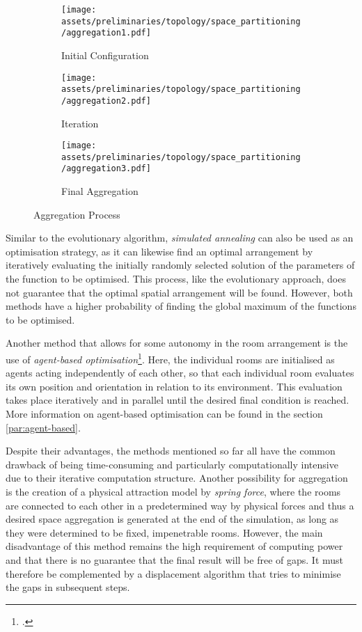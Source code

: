 \documentclass[a4paper, 12pt]{report}
\begin{document}
\begin{figure}
\centering
\begin{subfigure}{.33\textwidth}
\centering
\texttt{[image: assets/preliminaries/topology/space\_partitioning/aggregation1.pdf]}
\caption{Initial Configuration}
\label{fig:initial-configuration}
\end{subfigure}%
\begin{subfigure}{.33\textwidth}
\centering
\texttt{[image: assets/preliminaries/topology/space\_partitioning/aggregation2.pdf]}
\caption{Iteration}
\label{fig:iteration-1}
\end{subfigure}%
\begin{subfigure}{.33\textwidth}
\centering
\texttt{[image: assets/preliminaries/topology/space\_partitioning/aggregation3.pdf]}
\caption{Final Aggregation}
\label{fig:final-layout}
\end{subfigure}
\caption{Aggregation Process}
\label{fig:aggregation-method}
\end{figure}

Similar to the evolutionary algorithm, \textit{simulated annealing} can also be used as an optimisation strategy, as it can likewise find an optimal arrangement by iteratively evaluating the initially randomly selected solution of the parameters of the function to be optimised. This process, like the evolutionary approach, does not guarantee that the optimal spatial arrangement will be found. However, both methods have a higher probability of finding the global maximum of the functions to be optimised.

Another method that allows for some autonomy in the room arrangement is the use of \textit{agent-based optimisation}\footcite{guo2017evolutionary}. Here, the individual rooms are initialised as agents acting independently of each other, so that each individual room evaluates its own position and orientation in relation to its environment. This evaluation takes place iteratively and in parallel until the desired final condition is reached. More information on agent-based optimisation can be found in the section \ref{par:agent-based}.

Despite their advantages, the methods mentioned so far all have the common drawback of being time-consuming and particularly computationally intensive due to their iterative computation structure. Another possibility for aggregation is the creation of a physical attraction model by \textit{spring force}, where the rooms are connected to each other in a predetermined way by physical forces and thus a desired space aggregation is generated at the end of the simulation, as long as they were determined to be fixed, impenetrable rooms. However, the main disadvantage of this method remains the high requirement of computing power and that there is no guarantee that the final result will be free of gaps. It must therefore be complemented by a displacement algorithm that tries to minimise the gaps in subsequent steps.
\end{document}
